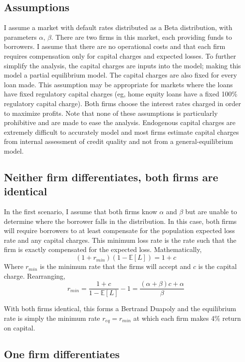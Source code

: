 \documentclass{article}
\theoremstyle{definition}
\begin{document}
\subsection{Assumptions}
I assume a market with default rates distributed as a Beta distribution, with parameters \(\alpha,\,\beta\).  There are two firms in this market, each providing funds to borrowers.  I assume that there are no operational costs and that each firm requires compensation only for capital charges and expected losses.  To further simplify the analysis, the capital charges are inputs into the model; making this model a partial equilibrium model.  The capital charges are also fixed for every loan made.  This assumption may be appropriate for markets where the loans have fixed regulatory capital charges (eg, home equity loans have a fixed 100\% regulatory capital charge).  Both firms choose the interest rates charged in order to maximize profits.  Note that none of these assumptions is particularly prohibitive and are made to ease the analysis.  Endogenous capital charges are extremely difficult to accurately model and most firms estimate capital charges from internal assessment of credit quality and not from a general-equilibrium model.  

\subsection{Neither firm differentiates, both firms are identical}

In the first scenario, I assume that both firms know \(\alpha\) and \(\beta\) but are unable to determine where the borrower falls in the distribution.  In this case, both firms will require borrowers to at least compensate for the population expected loss rate and any capital charges.  This minimum loss rate is the rate such that the firm is exactly compensated for the expected loss.  Mathematically, 
\[(1+r_{min})\left(1-\mathbb{E}[L]\right)=1+c\]
Where \(r_{min}\) is the minimum rate that the firms will accept and \(c\) is the capital charge.  
Rearranging, 
\[r_{min}=\frac{1+c}{1-\mathbb{E}[L]}-1=\frac{(\alpha+\beta)c+\alpha}{\beta}\]

With both firms identical, this forms a Bertrand Duapoly and the equilibrium rate is simply the minimum rate \(r_{eq}=r_{min}\) at which each firm makes 4\% return on capital.

\subsection{One firm differentiates}
\end{document}
